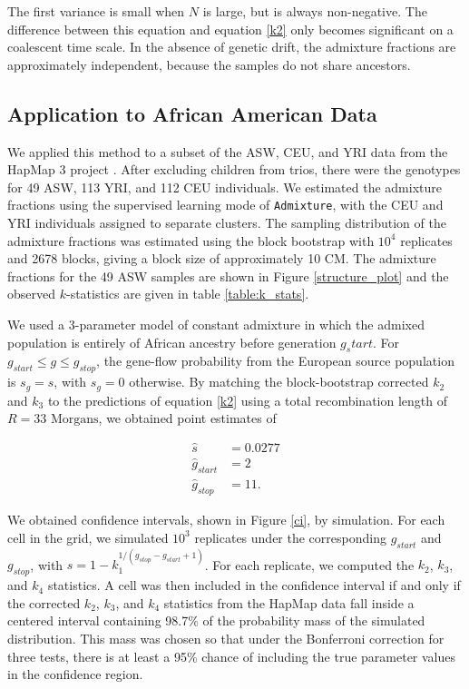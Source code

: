 \documentclass[11pt]{amsart}
\begin{document}
The first variance is small when $N$ is large, but is always non-negative.  
The difference between this equation and equation \ref{k2} only becomes significant on a coalescent time scale. In the absence of genetic drift, the admixture fractions are approximately independent, because the samples do not share ancestors.

\subsection*{Application to African American Data}
We applied this method to a subset of the ASW, CEU, and YRI data from the HapMap 3 project \citep{international2010integrating}.
After excluding children from trios, there were the genotypes for 49 ASW, 113 YRI, and 112 CEU individuals. 
We estimated the admixture fractions using the supervised learning mode of \verb|Admixture|, with the CEU and YRI individuals assigned to separate clusters. 
The sampling distribution of the admixture fractions was estimated using the block bootstrap with $10^4$ replicates and 2678 blocks, giving a block size of approximately 10 CM.
The admixture fractions for the 49 ASW samples are shown in Figure \ref{structure_plot} and the observed $k$-statistics are given in table \ref{table:k_stats}. 

We used a 3-parameter model of constant admixture in which the admixed population is entirely of African ancestry before generation $g_start$. For $g_{start}\leq g\leq g_{stop}$, the gene-flow probability from the European source population is $s_g=s$, with $s_g=0$ otherwise. By matching the block-bootstrap corrected $k_2$ and $k_3$ to the predictions of equation \ref{k2} using a total recombination length of $R=33\text{ Morgans}$, we obtained point estimates of 

\begin{align*}
 \hat{s} &= 0.0277\\
 \hat{g}_{start} &= 2 \\
 \hat{g}_{stop} &= 11.
\end{align*}

We obtained confidence intervals, shown in Figure \ref{ci}, by simulation. For each cell in the grid, we simulated $10^3$ replicates under the corresponding $g_{start}$ and $g_{stop}$, with $s=1-k_1^{1/(g_{stop}-g_{start}+1)}$. For each replicate, we computed the $k_2$, $k_3$, and $k_4$ statistics. A cell was then included in the confidence interval if and only if the corrected $k_2$, $k_3$, and $k_4$ statistics from the HapMap data fall inside a centered interval containing 98.7\% of the probability mass of the simulated distribution. This mass was chosen so that under the Bonferroni correction for three tests, there is at least a 95\% chance of including the true parameter values in the confidence region.
\end{document}
